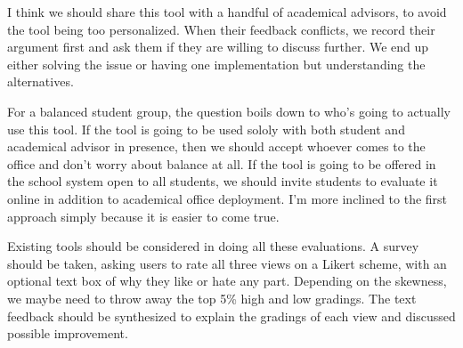 I think we should share this tool with a handful of academical advisors, to avoid the tool being too personalized. When their feedback conflicts, we record their argument first and ask them if they are willing  to discuss further. We end up either solving the issue or having one implementation but understanding the alternatives. 

For a balanced student group, the question boils down to who's going to actually use this tool. If the tool is going to be used sololy with both student and academical advisor in presence, then we should accept whoever comes to the office and don't worry about balance at all. If the tool is going to be offered in the school system open to all students, we should invite students to evaluate it online in addition to academical office deployment. I'm more inclined to the first approach simply because it is easier to come true.

Existing tools should be considered in doing all these evaluations. A survey should be taken, asking users to rate all three views on a Likert scheme, with an optional text box of why they like or hate any part. Depending on the skewness, we maybe need to throw away the top 5\% high and low gradings. The text feedback should be synthesized to explain the gradings of each view and discussed possible improvement.
